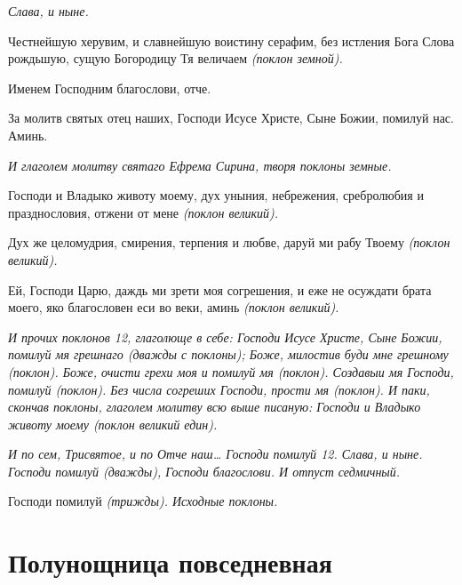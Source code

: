  \itshape Слава, и ныне\normalfont{}.


   Честнейшую херувим, и славнейшую воистину серафим, без истления
Бога Слова рождьшую, сущую Богородицу Тя величаем \itshape (поклон
земной)\normalfont{}.


   Именем Господним благослови, отче.


   За молитв святых отец наших, Господи Исусе Христе, Сыне Божии,
помилуй нас. Аминь.


 \itshape И глаголем молитву святаго Ефрема Сирина, творя поклоны земные.\normalfont{}


   Господи и Владыко животу моему, дух уныния, небрежения, сребролюбия
и празднословия, отжени от мене \itshape (поклон великий)\normalfont{}.


   Дух же целомудрия, смирения, терпения и любве, даруй ми рабу Твоему
\itshape (поклон великий)\normalfont{}.



   Ей, Господи Царю, даждь ми зрети моя согрешения, и еже не
осуждати брата моего, яко благословен еси во веки, аминь \itshape (поклон
великий)\normalfont{}.


 \itshape И прочих поклонов 12, глаголюще в себе:\normalfont{} Господи Исусе Христе, Сыне
Божии, помилуй мя грешнаго \itshape (дважды с поклоны)\normalfont{}; Боже, милостив буди
мне грешному \itshape (поклон)\normalfont{}. Боже, очисти грехи моя и помилуй мя \itshape (поклон)\normalfont{}.
Создавыи мя Господи, помилуй \itshape (поклон)\normalfont{}. Без числа согреших Господи,
прости мя \itshape (поклон)\normalfont{}. \itshape И паки, скончав поклоны, глаголем молитву всю
выше писаную:\normalfont{} Господи и Владыко животу моему \itshape (поклон великий
един)\normalfont{}.


 \itshape И по сем,\normalfont{} \itshape Трисвятое\normalfont{}, \itshape и по\normalfont{} Отче наш… Господи помилуй \itshape 12\normalfont{}. \itshape Слава, и
ныне\normalfont{}. Господи помилуй \itshape (дважды)\normalfont{}, Господи благослови. \itshape И отпуст
седмичный.\normalfont{}


   Господи помилуй \itshape (трижды)\normalfont{}. \itshape Исходные поклоны.\normalfont{}



\section{Полунощница повседневная}



